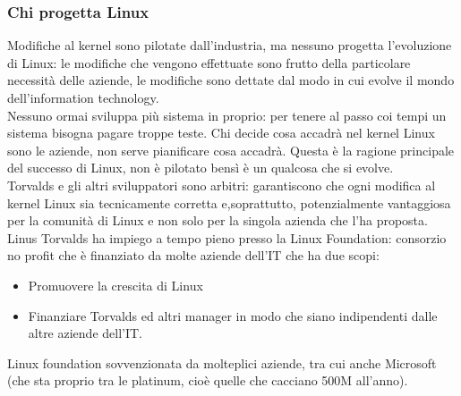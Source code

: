\documentclass[12pt, oneside]{extbook}
\begin{document}
\subsubsection{Chi progetta Linux}
Modifiche al kernel sono pilotate dall'industria, ma nessuno progetta l'evoluzione di Linux: le modifiche che vengono effettuate sono frutto della particolare necessità delle aziende, le modifiche sono dettate dal modo in cui evolve il mondo dell'information technology.\\ Nessuno ormai sviluppa più sistema in proprio: per tenere al passo coi tempi un sistema bisogna pagare troppe teste. Chi decide cosa accadrà nel kernel Linux sono le aziende, non serve pianificare cosa accadrà. Questa è la ragione principale del successo di Linux, non è pilotato bensì è un qualcosa che si evolve.\\ Torvalds e gli altri sviluppatori sono arbitri: garantiscono che ogni modifica al kernel Linux sia tecnicamente corretta e,soprattutto, potenzialmente vantaggiosa per la comunità di Linux e non solo per la singola azienda che l'ha proposta.\\ Linus Torvalds ha impiego a tempo pieno presso la Linux Foundation: consorzio no profit che è finanziato da molte aziende dell'IT che ha due scopi:
\begin{itemize}
\item Promuovere la crescita di Linux
\item Finanziare Torvalds ed altri manager in modo che siano indipendenti dalle altre aziende dell'IT.
\end{itemize}
Linux foundation sovvenzionata da molteplici aziende, tra cui anche Microsoft (che sta proprio tra le platinum, cioè quelle che cacciano 500M all'anno).
\end{document}
